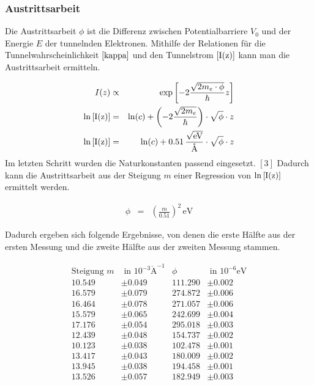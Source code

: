 \documentclass[12pt,a4paper]{scrartcl}
\numberwithin{equation}{section} %
\begin{document}
\hypertarget{austrittsarbeit-1}{%
\subsubsection{Austrittsarbeit}\label{austrittsarbeit-1}}

Die Austrittsarbeit $\phi$ ist die Differenz zwischen
Potentialbarriere $V_0$ und der Energie $E$ der tunnelnden
Elektronen. Mithilfe der Relationen für die Tunnelwahrscheinlichkeit
$\eqref{kappa}$ und den Tunnelstrom $\eqref{I(z)}$ kann man die
Austrittsarbeit ermitteln.

\begin{eqnarray}
    I(z) &\propto& \exp\left[-2\frac{\sqrt{2m_e\cdot \phi}}{\hbar} z\right] \\
    \ln\eqref{I(z)}
        &=& \ln(c)
            + \left(-2\frac{\sqrt{2m_e}}{\hbar}\right)
            \cdot \sqrt{\phi} \cdot z \\
    \ln\eqref{I(z)} &=& \ln(c) + 0.51 \mathrm{\,\frac{\sqrt{eV}}{\mathrm{\mathring{A}}}}\cdot \sqrt{\phi} \cdot z
\end{eqnarray}
Im letzten Schritt wurden die Naturkonstanten passend eingesetzt.
$[3]$ Dadurch kann die Austrittsarbeit aus der Steigung $m$ einer
Regression von $\ln\eqref{I(z)}$ ermittelt werden.

\begin{eqnarray}
    \phi &=& \left(\frac{m}{0.51}\right)^2 \mathrm{\,eV}
\end{eqnarray}

Dadurch ergeben sich folgende Ergebnisse, von denen die erste Hälfte aus
der ersten Messung und die zweite Hälfte aus der zweiten Messung
stammen.

\begin{align*}
    \text{Steigung } m &\text{ in } 10^{-3}\mathrm{\mathring A}^{-1}
        & \phi &\text{ in } 10^{-6}\mathrm{eV} \\
    10.549 &\pm 0.049 & 111.290 &\pm 0.002 \\
    16.579 &\pm 0.079 & 274.872 &\pm 0.006 \\
    16.464 &\pm 0.078 & 271.057 &\pm 0.006 \\
    15.579 &\pm 0.065 & 242.699 &\pm 0.004 \\
    17.176 &\pm 0.054 & 295.018 &\pm 0.003 \\
    12.439 &\pm 0.048 & 154.737 &\pm 0.002 \\
    10.123 &\pm 0.038 & 102.478 &\pm 0.001 \\
    13.417 &\pm 0.043 & 180.009 &\pm 0.002 \\
    13.945 &\pm 0.038 & 194.458 &\pm 0.001 \\
    13.526 &\pm 0.057 & 182.949 &\pm 0.003
\end{align*}
\end{document}
